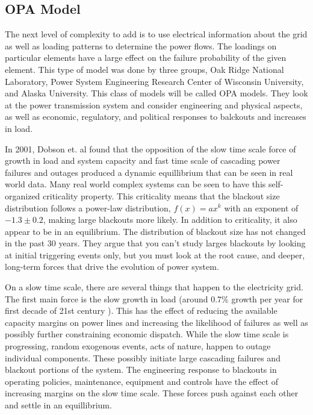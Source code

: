\subsection{OPA Model}

The next level of complexity to add is to use electrical information about the grid as well as loading patterns to determine the power flows.  The loadings on particular elements have a large effect on the failure probability of the given element.  This type of model was done by three groups, Oak Ridge National Laboratory, Power System Engineering Research Center of Wisconsin University, and Alaska University.  This class of models will be called OPA models.  They look at the power transmission system and consider engineering and physical aspects, as well as economic, regulatory, and political responses to balckouts and increases in load.

In 2001, Dobson et. al \cite{dobson_2001} found that the opposition of the slow time scale force of growth in load and system capacity and fast time scale of cascading power failures and outages produced a dynamic equillibrium that can be seen in real world data.  Many real world complex systems can be seen to have this self-organized criticality property.  This criticality means that the blackout size distribution follows a power-law distribution, $f(x) = ax^k$ with an exponent of $-1.3 \pm 0.2$,  making large blackouts more likely.  In addition to criticality, it also appear to be in an equilibrium.  The distribution of blackout size has not changed in the past 30 years.  They argue that you can't study larges blackouts by looking at initial triggering events only, but you must look at the root cause, and deeper, long-term forces that drive the evolution of power system.

On a slow time scale, there are several things that happen to the electricity grid.  The first main force is the slow growth in load (around 0.7\% growth per year for first decade of 21st century \cite{eia_gov}).  This has the effect of reducing the available capacity margins on power lines and increasing the likelihood of failures as well as possibly further constraining economic dispatch.  While the slow time scale is progressing, random exogenous events, acts of nature, happen to outage individual components.  These possibly initiate large cascading failures and blackout portions of the system.  The engineering response to blackouts in operating policies, maintenance, equipment and controls have the effect of increasing margins on the slow time scale.  These forces push against each other and settle in an equillibrium.

